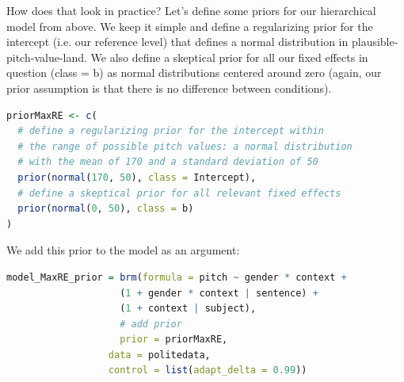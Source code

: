 \documentclass[nobib]{tufte-handout}
\newcommand{\tr}[1]{\textcolor{DarkOrange}{[tr: #1]}}
\begin{document}
How does that look in practice? Let's define some priors for our hierarchical model from above. We keep it simple and define a regularizing prior for the intercept (i.e. our reference level) that defines a normal distribution in plausible-pitch-value-land. We also define a skeptical prior for all our fixed effects in question (class = b) as normal distributions centered around zero (again, our prior assumption is that there is no difference between conditions).  


\begin{minipage}[]{1\textwidth}
\begin{lstlisting}[language=R]
priorMaxRE <- c(
  # define a regularizing prior for the intercept within 
  # the range of possible pitch values: a normal distribution 
  # with the mean of 170 and a standard deviation of 50
  prior(normal(170, 50), class = Intercept),
  # define a skeptical prior for all relevant fixed effects
  prior(normal(0, 50), class = b)
)
\end{lstlisting}
\end{minipage}

We add this prior to the model as an argument:

\begin{minipage}[]{1\textwidth}
\begin{lstlisting}[language=R]
model_MaxRE_prior = brm(formula = pitch ~ gender * context +
                    (1 + gender * context | sentence) +
                    (1 + context | subject),
                    # add prior 
                    prior = priorMaxRE,
                  data = politedata,
                  control = list(adapt_delta = 0.99))
\end{lstlisting}
\end{minipage}


\end{document}
